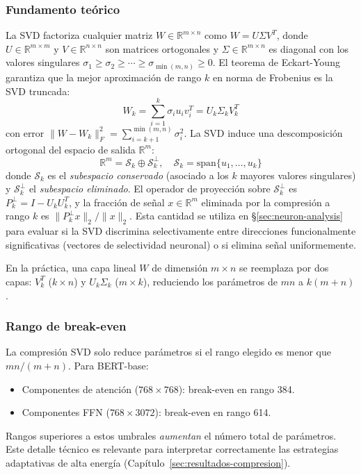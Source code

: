 \subsubsection{Fundamento teórico}

La SVD factoriza cualquier matriz $W \in \mathbb{R}^{m \times n}$ como
$W = U \Sigma V^T$, donde $U \in \mathbb{R}^{m \times m}$ y
$V \in \mathbb{R}^{n \times n}$ son matrices ortogonales y
$\Sigma \in \mathbb{R}^{m \times n}$ es diagonal con los valores singulares
$\sigma_1 \geq \sigma_2 \geq \cdots \geq \sigma_{\min(m,n)} \geq 0$. El
teorema de Eckart-Young \cite{eckart1936approximation} garantiza que la mejor
aproximación de rango $k$ en norma de Frobenius es la SVD truncada:
\begin{equation}
    W_k = \sum_{i=1}^{k} \sigma_i u_i v_i^T = U_k \Sigma_k V_k^T
    \label{eq:svd-truncada}
\end{equation}
con error $\|W - W_k\|_F^2 = \sum_{i=k+1}^{\min(m,n)} \sigma_i^2$. La SVD induce
una descomposición ortogonal del espacio de salida $\mathbb{R}^m$:
\begin{equation}
    \mathbb{R}^m = \mathcal{S}_k \oplus \mathcal{S}_k^\perp,
    \quad \mathcal{S}_k = \text{span}\{u_1, \ldots, u_k\}
    \label{eq:subespacios}
\end{equation}
donde $\mathcal{S}_k$ es el \emph{subespacio conservado} (asociado a los $k$
mayores valores singulares) y $\mathcal{S}_k^\perp$ el \emph{subespacio
eliminado}. El operador de proyección sobre $\mathcal{S}_k^\perp$ es
$P_k^\perp = I - U_k U_k^T$, y la fracción de señal $x \in \mathbb{R}^m$
eliminada por la compresión a rango $k$ es
$\|P_k^\perp x\|_2 / \|x\|_2$. Esta cantidad se utiliza en
\S\ref{sec:neuron-analysis} para evaluar si la SVD discrimina selectivamente
entre direcciones funcionalmente significativas (vectores de selectividad
neuronal) o si elimina señal uniformemente.

En la práctica, una capa lineal $W$ de dimensión $m \times n$ se reemplaza
por dos capas: $V_k^T$ ($k \times n$) y $U_k \Sigma_k$ ($m \times k$),
reduciendo los parámetros de $mn$ a $k(m+n)$.

\subsubsection{Rango de break-even}

La compresión SVD solo reduce parámetros si el rango elegido es menor que
$mn/(m+n)$. Para BERT-base:
\begin{itemize}[nosep]
    \item Componentes de atención ($768 \times 768$): break-even en rango 384.
    \item Componentes FFN ($768 \times 3072$): break-even en rango 614.
\end{itemize}
Rangos superiores a estos umbrales \emph{aumentan} el número total de parámetros.
Este detalle técnico es relevante para interpretar correctamente las estrategias
adaptativas de alta energía (Capítulo~\ref{sec:resultados-compresion}).

